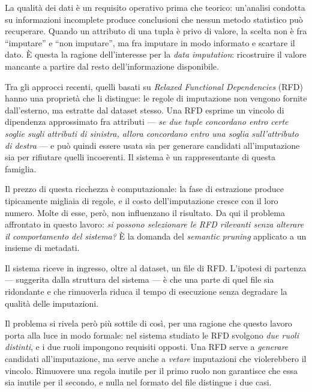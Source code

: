 \newpage\pagestyle{introduction}



La qualità dei dati è un requisito operativo prima che teorico: un'analisi condotta su
informazioni incomplete produce conclusioni che nessun metodo statistico può recuperare. Quando
un attributo di una tupla è privo di valore, la scelta non è fra ``imputare'' e ``non imputare'',
ma fra imputare in modo informato e scartare il dato. È questa la ragione dell'interesse per la
\emph{data imputation}: ricostruire il valore mancante a partire dal resto dell'informazione
disponibile.

Tra gli approcci recenti, quelli basati su \emph{Relaxed Functional Dependencies} (RFD) hanno una
proprietà che li distingue: le regole di imputazione non vengono fornite dall'esterno, ma estratte
dal dataset stesso. Una RFD esprime un vincolo di dipendenza approssimato fra attributi ---
\emph{se due tuple concordano entro certe soglie sugli attributi di sinistra, allora concordano
entro una soglia sull'attributo di destra} --- e può quindi essere usata sia per generare
candidati all'imputazione sia per rifiutare quelli incoerenti. Il sistema \renuver{} \cite{breve2022renuver}
è un rappresentante di questa famiglia.

Il prezzo di questa ricchezza è computazionale: la fase di estrazione produce tipicamente migliaia
di regole, e il costo dell'imputazione cresce con il loro numero. Molte di esse, però, non
influenzano il risultato. Da qui il problema affrontato in questo lavoro: \emph{si possono
selezionare le RFD rilevanti senza alterare il comportamento del sistema?} È la domanda del
\emph{semantic pruning} applicato a un insieme di metadati.


Il sistema \renuver{} riceve in ingresso, oltre al dataset, un file di RFD. L'ipotesi di partenza
--- suggerita dalla struttura del sistema --- è che una parte di quel file sia ridondante e che
rimuoverla riduca il tempo di esecuzione senza degradare la qualità delle imputazioni.

Il problema si rivela però più sottile di così, per una ragione che questo lavoro porta alla luce
in modo formale: nel sistema studiato le RFD svolgono \emph{due ruoli distinti}, e i due ruoli
impongono requisiti opposti. Una RFD serve a \emph{generare} candidati all'imputazione, ma serve
anche a \emph{vetare} imputazioni che violerebbero il vincolo. Rimuovere una regola inutile per il
primo ruolo non garantisce che essa sia inutile per il secondo, e nulla nel formato del file
distingue i due casi.


